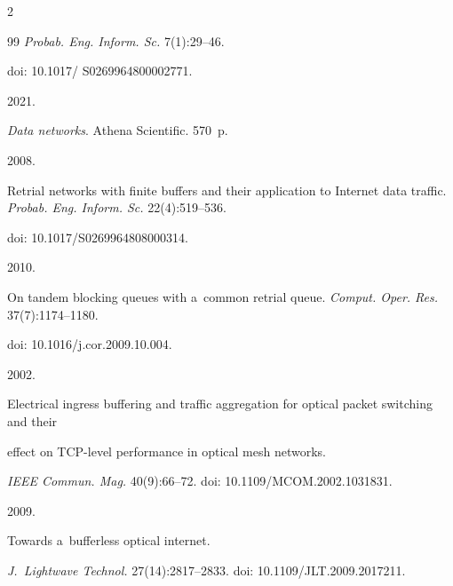 \begin{multicols}{2}
{{\begin{thebibliography}{99}
\textit{Probab. Eng. Inform. Sc.} 7(1):29--46.


doi: 10.1017/ S0269964800002771.






 2021.


\textit{Data networks}. Athena Scientific. 570~p.






 2008.


Retrial networks with finite buffers and their application to Internet data traffic. \textit{Probab. Eng. Inform. Sc.} 22(4):519--536.


doi: 10.1017/S0269964808000314.






 2010.


On tandem blocking queues with a~common retrial queue. \textit{Comput. Oper. Res.} 37(7):1174--1180.


doi: 10.1016/j.cor.2009.10.004.









 2002.


Electrical ingress buffering and traffic aggregation for optical packet switching and their


effect on TCP-level performance in optical mesh networks.


\textit{IEEE Commun. Mag.} 40(9):66--72. doi: 10.1109/MCOM.2002.1031831.









 2009.


Towards a~bufferless optical internet.


\textit{J.~Lightwave Technol.} 27(14):2817--2833. doi: 10.1109/JLT.2009.2017211.








\end{thebibliography}}}
\end{multicols}
